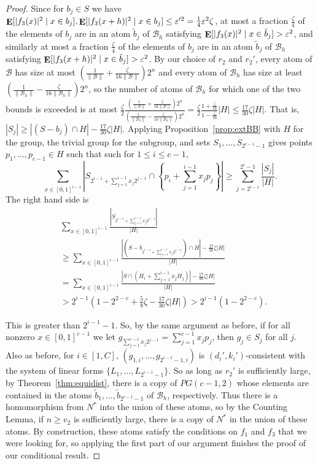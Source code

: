\documentclass{article}
\theoremstyle{plain}
\theoremstyle{definition}
\theoremstyle{definition}
\theoremstyle{remark}
\numberwithin{equation}{section}
\newcommand{\Esymb}{{\bf E}}
\DeclareMathOperator*{\E}{\Esymb}
\newcommand{\cB}{\mathcal B}
\begin{document}
\begin{proof}
Since for $b_j\in S$ we have $\E[|f_3(x)|^2 \mid x\in b_j],\E[|f_3(x+h)|^2 \mid x\in b_j]\leq \varepsilon'^2=\frac{1}{4}\varepsilon^2 \zeta$, at most a fraction $\frac{\zeta}{4}$ of the elements of $b_j$ are in an atom $\tilde b_j$ of $\cB_h$ satisfying $\E[|f_3(x)|^2 \mid x\in \tilde b_j]>\varepsilon^2$, and similarly at most a fraction $\frac{\zeta}{4}$ of the elements of $b_j$ are in an atom $\tilde b_j$ of $\cB_h$ satisfying $\E[|f_3(x+h)|^2 \mid x\in \tilde b_j]>\varepsilon^2$. By our choice of $r_2$ and $r_2'$, every atom of $\cB$ has size at most $(\frac{1}{\|\cB\|}+\frac{\zeta}{16\|\cB\|})2^n$ and
every atom of $\cB_h$ has size at least $(\frac{1}{\|\cB_h\|}-\frac{\zeta}{16\|\cB_h\|})2^n$, so the number of atoms of $\cB_h$ for which one of the two bounds is exceeded is at most $\frac{\zeta}{2}\frac{\left(\frac{1}{\|\cB\|}+\frac{\zeta}{16\|\cB\|}\right)2^n}{\left(\frac{1}{\|\cB_h\|}-\frac{\zeta}{16\|\cB_h\|}\right)2^n}=\frac{\zeta}{2}\frac{1+\frac{\zeta}{16}}{1-\frac{\zeta}{16}}|H|\leq \frac{17}{30}\zeta|H|$. That is,
$|S_j|\geq |(S-b_j)\cap H|-\frac{17}{30}\zeta|H|$. Applying Proposition~\ref{prop:extBB} with $H$ for the group, the trivial group for the subgroup, and sets $S_1,\dots,S_{2^{c-1}-1}$ gives points $p_1,\dots,p_{c-1}\in H$ such that such for $1\leq i\leq c-1$,
\[
    \sum_{x\in[0,1]^{i-1}} \left | S_{2^{i-1}+\sum_{j=1}^{i-1} x_j 2^{j-1}}\cap \left \{ p_i + \sum_{j=1}^{i-1} x_j p_j \right \} \right | \geq \sum_{j=2^{i-1}}^{2^i-1}\frac{|S_j|}{|H|}.
\]
The right hand side is
\begin{align*}
    & \sum_{x\in[0,1]^{i-1}} \frac{\left | S_{2^{i-1}+\sum_{j=1}^{i-1} x_j 2^{j-1}} \right |}{|H|} \\
    & \geq \sum_{x\in[0,1]^{i-1}} \frac{|(S-b_{2^{i-1}+\sum_{j=1}^{i-1} x_j 2^{j-1}})\cap H|-\frac{17}{30}\zeta|H|}{|H|} \\
    & = \sum_{x\in[0,1]^{i-1}} \frac{\left | S\cap \left( H_i + \sum_{j=1}^{i-1} x_j H_j \right ) \right | - \frac{17}{30}\zeta|H|}{|H|} \\
    & > 2^{i-1} \left(1-2^{2-c}+\frac{5}{8}\zeta - \frac{17}{30}\zeta|H| \right ) > 2^{i-1}(1-2^{2-c}).
\end{align*}

This is greater than $2^{i-1}-1$. So, by the same argument as before, if for all nonzero $x\in [0,1]^{c-1}$ we let $g_{\sum_{j=1}^{c-1} x_j 2^{j-1}} = \sum_{j=1}^{c-1} x_j p_j$, then $g_j\in S_j$ for all $j$. Also as before, for $i\in [1,C]$, $(g_{1,i},\dots,g_{2^{c-1}-1,i})$ is $(d_i',k_i')$-consistent with the system of linear forms $\{L_1,\dots,L_{2^{c-1}-1}\}$. So as long as $r_2'$ is sufficiently large, by Theorem~\ref{thm:equidist}, there is a copy of $PG(c-1,2)$ whose elements are contained in the atoms $\tilde b_1,\dots, \tilde b_{2^{c-1}-1}$ of $\cB_h$, respectively. Thus there is a homomorphism from $N^*$ into the union of these atoms, so by the Counting Lemma, if $n\geq v_2$ is sufficiently large, there is a copy of $N^*$ in the union of these atoms. By construction, these atoms satisfy the conditions on $f_1$ and $f_3$ that we were looking for, so applying the first part of our argument finishes the proof of our conditional result.

\end{proof}
\end{document}
